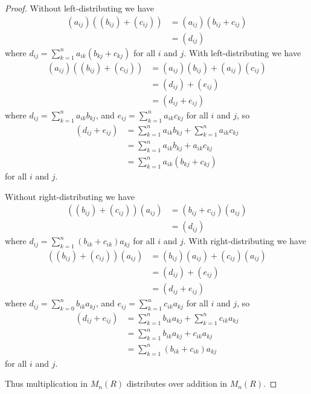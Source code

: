 \documentclass{abrice}
\begin{document}
\begin{proof}
  Without left-distributing we have
  \begin{align*}
    (a_{ij})((b_{ij}) + (c_{ij}))
    &= (a_{ij})(b_{ij} + c_{ij}) \\
    &= (d_{ij})
  \end{align*}
  where $d_{ij} = \sum_{k=1}^{n} a_{ik}(b_{kj} + c_{kj})$ for all $i$ and $j$.
  With left-distributing we have
  \begin{align*}
    (a_{ij})((b_{ij}) + (c_{ij}))
    &= (a_{ij})(b_{ij}) + (a_{ij})(c_{ij}) \\
    &= (d_{ij}) + (e_{ij}) \\
    &= (d_{ij} + e_{ij})
  \end{align*}
  where $d_{ij} = \sum_{k=1}^n a_{ik} b_{kj}$, and $e_{ij} = \sum_{k=1}^n a_{ik}
  c_{kj}$ for all $i$ and $j$, so
  \begin{align*}
    (d_{ij} + e_{ij})
    &= \sum_{k=1}^n a_{ik} b_{kj} + \sum_{k=1}^n a_{ik} c_{kj} \\
    &= \sum_{k=1}^n a_{ik} b_{kj} + a_{ik} c_{kj} \\
    &= \sum_{k=1}^n a_{ik} (b_{kj} + c_{kj})
  \end{align*}
  for all $i$ and $j$.

  Without right-distributing we have
  \begin{align*}
    ((b_{ij}) + (c_{ij}))(a_{ij})
    &= (b_{ij} + c_{ij})(a_{ij}) \\
    &= (d_{ij})
  \end{align*}
  where $d_{ij} = \sum_{k=1}^n (b_{ik} + c_{ik}) a_{kj}$ for all $i$ and $j$.
  With right-distributing we have
  \begin{align*}
    ((b_{ij}) + (c_{ij}))(a_{ij})
    &= (b_{ij})(a_{ij}) + (c_{ij})(a_{ij}) \\
    &= (d_{ij}) + (e_{ij}) \\
    &= (d_{ij} + e_{ij})
  \end{align*}
  where $d_{ij} = \sum_{k=0}^n b_{ik} a_{kj}$, and $e_{ij} = \sum_{k=1}^n c_{ik}
  a_{kj}$ for all $i$ and $j$, so
  \begin{align*}
    (d_{ij} + e_{ij})
    &= \sum_{k=1}^n b_{ik} a_{kj} + \sum_{k=1}^n c_{ik} a_{kj} \\
    &= \sum_{k=1}^n b_{ik} a_{kj} + c_{ik} a_{kj} \\
    &= \sum_{k=1}^n (b_{ik} + c_{ik}) a_{kj}
  \end{align*}
  for all $i$ and $j$.

  Thus multiplication in $M_n(R)$ distributes over addition in $M_n(R)$.
\end{proof}
\end{document}
